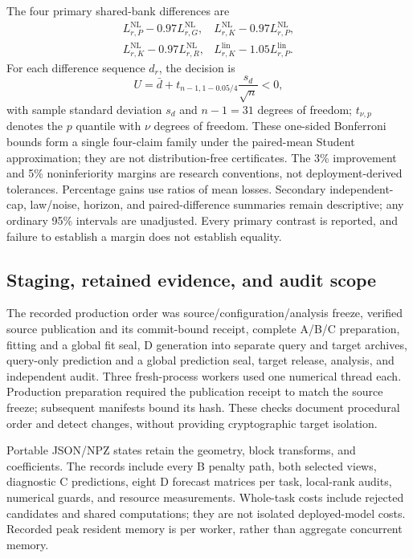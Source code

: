 The four primary shared-bank differences are
\[
 \begin{array}{ll}
 L_{r,P}^{\mathrm{NL}}-0.97L_{r,G}^{\mathrm{NL}}, &
 L_{r,K}^{\mathrm{NL}}-0.97L_{r,P}^{\mathrm{NL}},\\
 L_{r,K}^{\mathrm{NL}}-0.97L_{r,R}^{\mathrm{NL}}, &
 L_{r,K}^{\mathrm{lin}}-1.05L_{r,P}^{\mathrm{lin}}.
 \end{array}
\]
For each difference sequence $d_r$, the decision is
\begin{equation}
 U=\bar d+t_{n-1,1-0.05/4}\frac{s_d}{\sqrt n}<0,
 \label{eq:supp-sa-primary}
\end{equation}
with sample standard deviation $s_d$ and $n-1=31$ degrees of freedom;
$t_{\nu,p}$ denotes the $p$ quantile with $\nu$ degrees of freedom.
These one-sided Bonferroni bounds form a single four-claim family under
the paired-mean Student approximation; they are not distribution-free
certificates. The 3\% improvement and 5\% noninferiority margins are
research conventions, not deployment-derived tolerances.
Percentage gains use ratios of mean losses. Secondary independent-cap,
law/noise, horizon, and paired-difference summaries remain descriptive;
any ordinary 95\% intervals are unadjusted. Every primary contrast is
reported, and failure to establish a margin does not establish equality.

\subsection{Staging, retained evidence, and audit scope}

The recorded production order was source/configuration/analysis freeze, verified
source publication and its commit-bound receipt, complete A/B/C
preparation, fitting and a global fit seal, D generation into separate
query and target archives, query-only prediction and a global prediction
seal, target release, analysis, and independent audit.
Three fresh-process workers used one numerical thread each.
Production preparation required the publication receipt to match the
source freeze; subsequent manifests bound its hash.
These checks document procedural order and detect
changes, without providing cryptographic target isolation.

Portable JSON/NPZ states retain the geometry, block transforms, and
coefficients. The records include every B penalty path, both selected
views, diagnostic C predictions, eight D forecast matrices per task,
local-rank audits, numerical guards, and resource measurements.
Whole-task costs include rejected candidates and shared computations;
they are not isolated deployed-model costs. Recorded peak resident
memory is per worker, rather than aggregate concurrent memory.

